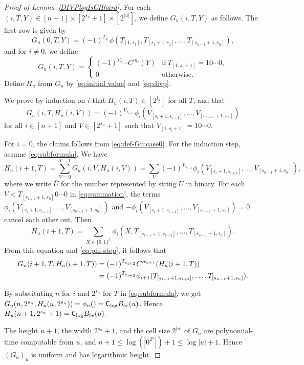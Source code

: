 \begin{proof}[\textup{Proof of Lemma~\ref{DIVPlogIsCHhard}}]
For each $(i, T, Y) \in [n+1] \times [2^{s_n}+1] \times [2^{|u|}]$,
we define $G_u (i, T, Y)$ as follows.
The first row is given by
 \begin{equation}\label{eq:def-Gu:case0}
  G_u(0,T,Y) = 
   (-1)^{T_{s_1}}\phi(T_{[1,s_1]}, T_{[s_1+1,s_2]},
    \dots, T_{[s_{n-1}+1,s_n]}), 
 \end{equation}
and for $i \neq 0$, we define 
 \begin{equation} 
  G_u(i,T,Y) = 
   \begin{cases}
    (-1)^{T_{s_{i+1}}} C^{m_i}(Y) 
    & \text{if} \ T_{[1,s_i+1]} = 10 \cdots 0, \\
    0 & \text{otherwise}.
   \end{cases} 
 \end{equation}
Define $H_u$ from $G_u$ by \eqref{eq:initial value} and \eqref{eq:divp}.

We prove by induction on $i$ that $H_u(i, T) \in [2^{l_u}]$ for all $T$, and that
 \begin{equation} \label{eq:subformula}
  G_u(i,T,H_u(i,V)) = (-1)^{V_{s_{i+1}}} 
   \phi_i(V_{[s_i+1, s_{i+1}]}, \dots, V_{[s_{n-1}+1, s_n]})
 \end{equation}
for all $i \in [n+1]$ and $V \in [2^{s_n}+1]$
such that $V_{[1, s_i +1]} = 10 \cdots 0$.

For $i=0$, the claims follows from \eqref{eq:def-Gu:case0}.
For the induction step, assume \eqref{eq:subformula}. 
We have
 \begin{equation} \label{eq:summation}
  H_u(i+1, T) 
  = \sum_{V = 0}^{T-1} G_u(i, V, H_u(i, V)) 
  = \sum_{V} (-1)^{V_{s_{i+1}}} \phi_i(V_{[s_i+1, s_{i+1}]}, 
   \dots, V_{[s_{n-1}+1, s_n]}),
 \end{equation}
where we write $\overline U$ for the number represented by string $U$ in binary.
For each $V < \overline{T_{[s_{i+1}+1, s_n]} 0 \cdots 0}$ in \eqref{eq:summation},
the terms $\phi_i(V_{[s_i+1, s_{i+1}]}, \dots, V_{[s_{n-1}+1, s_n]})$ and
 $- \phi_i(V_{[s_i+1, s_{i+1}]}, \dots, V_{[s_{n-1}+1, s_n]}) = 0$ cancel each other out. Then 
 \begin{equation}
  H_u(i+1, T) = \sum_{X \in \{0,1\}^{l_i}}
  \phi_i(X, T_{[s_{i+1}+1, s_{i+2}]}, \dots, T_{[s_{n-1}+1, s_n]}).
 \end{equation}
 From this equation and \eqref{eq:phi-step}, it follows that
 \begin{align}
  G_u(i+1,T,H_u(i+1,T)) 
  &= (-1)^{T_{s_{i+2}}} C^{m_{i+1}} (H_u(i+1, T))
\notag
\\
  &= (-1)^{T_{s_{i+2}}} \phi_{i+1}(T_{[s_{i+1}+1, s_{i+2}]}, \dots, T_{[s_{n-1}+1, s_n]}).
 \end{align}


By substituting $n$ for $i$ and $2^{s_n}$ for $T$ in \eqref{eq:subformula},
we get $G_u(n, 2^{s_n}, H_u(n,2^{s_n})) = \phi_n() = \mathsf{C}_{\log} B_{be}(u)$.
Hence $H_u(n+1, 2^{s_n}+1) = \mathsf{C}_{\log} B_{be}(u)$.
 
The height $n+1$, the width $2^{s_n}+1$, and the cell size $2^{|u|}$
of $G_u$ are polynomial-time computable from $u$, 
and $n+1 \le \log(|0^{2^n}|) + 1 \le \log|u| + 1$.
Hence $(G_u)_u$ is uniform and has logarithmic height. 
\end{proof}


